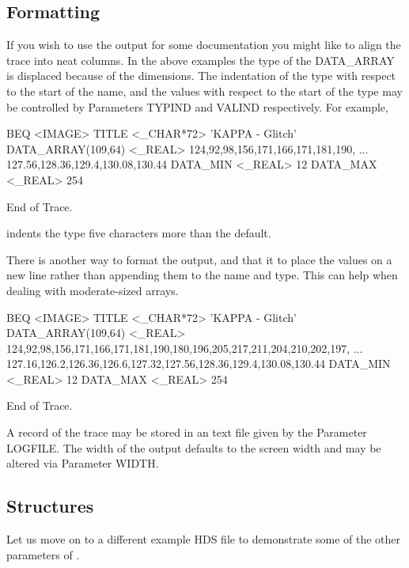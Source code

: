 \documentclass[11pt,nolof]{starlink}
\begin{document}
\subsection{Formatting}

If you wish to use the output for some documentation you might like
to align the trace into neat columns.  In the above examples the
type of the DATA\_ARRAY is displaced because of the dimensions.  The
indentation of the type with respect to the start of the name, and the
values with respect to the start of the type may be controlled by
Parameters TYPIND and VALIND respectively.  For example,

\small
\begin{terminalv}

BEQ  <IMAGE>
  TITLE               <_CHAR*72>      'KAPPA - Glitch'
  DATA_ARRAY(109,64)  <_REAL>         124,92,98,156,171,166,171,181,190,
                                      ... 127.56,128.36,129.4,130.08,130.44
  DATA_MIN            <_REAL>         12
  DATA_MAX            <_REAL>         254

End of Trace.
\end{terminalv}
\normalsize
indents the type five characters more than the default.

There is another way to format the output, and that it to place the
values on a new line rather than appending them to the name and type.
This can help when dealing with moderate-sized arrays.

\small
\begin{terminalv}

BEQ  <IMAGE>
  TITLE          <_CHAR*72>
   'KAPPA - Glitch'
  DATA_ARRAY(109,64)  <_REAL>
   124,92,98,156,171,166,171,181,190,180,196,205,217,211,204,210,202,197,
   ... 127.16,126.2,126.36,126.6,127.32,127.56,128.36,129.4,130.08,130.44
  DATA_MIN       <_REAL>
   12
  DATA_MAX       <_REAL>
   254

End of Trace.
\end{terminalv}
\normalsize
A record of the trace may be stored in an text file given by the
Parameter LOGFILE.  The width of the output defaults to the screen
width and may be altered via Parameter WIDTH.

\subsection{Structures}

Let us move on to a different example HDS file to demonstrate some of
the other parameters of \HDSTRACE.
\end{document}
